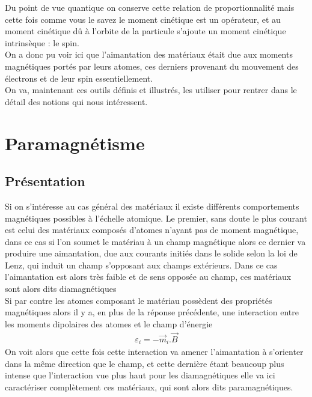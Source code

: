 \documentclass[12pt,prb,aps,epsf]{article}
\begin{document}
Du point de vue quantique on conserve cette relation de proportionnalité mais cette fois comme vous le savez le moment cinétique est un opérateur, et au moment cinétique dû à l'orbite de la particule s'ajoute un moment cinétique intrinsèque : le spin.\\ %

On a donc pu voir ici que l'aimantation des matériaux était due aux moments magnétiques portés par leurs atomes, ces derniers provenant du mouvement des électrons et de leur spin essentiellement.\\

On va, maintenant ces outils définis et illustrés, les utiliser pour rentrer dans le détail des notions qui nous intéressent.

\section{Paramagnétisme}
\subsection{Présentation}
Si on s'intéresse au cas général des matériaux il existe différents comportements magnétiques possibles à l'échelle atomique. Le premier, sans doute le plus courant est celui des matériaux composés d'atomes n'ayant pas de moment magnétique, dans ce cas si l'on soumet le matériau à un champ magnétique alors ce dernier va produire une aimantation, due aux courants initiés dans le solide selon la loi de Lenz, qui induit un champ s'opposant aux champs extérieurs. Dans ce cas l'aimantation est alors très faible et de sens opposée au champ, ces matériaux sont alors dits diamagnétiques\\

Si par contre les atomes composant le matériau possèdent des propriétés magnétiques alors il y a, en plus de la réponse précédente, une interaction entre les moments dipolaires des atomes et le champ d'énergie 
\begin{eqnarray}
\varepsilon_i = -\vec{m}_i.\vec{B}
\end{eqnarray}
On voit alors que cette fois cette interaction va amener l'aimantation à s'orienter dans la même direction que le champ, et cette dernière étant beaucoup plus intense que l'interaction vue plus haut pour les diamagnétiques elle va ici caractériser complètement ces matériaux, qui sont alors dits paramagnétiques.
\end{document}
